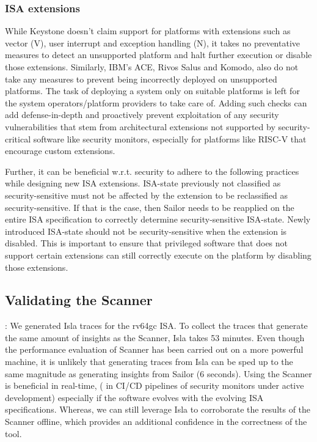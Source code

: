 \subsubsection{ISA extensions}
\label{sec:isa-ext-discussion}
While Keystone doesn't claim support for platforms with extensions such as vector (V), user interrupt and exception handling (N), it takes no preventative measures to detect an unsupported platform and halt further execution or disable those extensions. 
Similarly, IBM's ACE, Rivos Salus and Komodo, also do not take any measures to prevent being incorrectly deployed on unsupported platforms. 
The task of deploying a system only on suitable platforms is left for the system operators/platform providers to take care of. 
Adding such checks can add defense-in-depth and proactively prevent exploitation of any security vulnerabilities that stem from architectural extensions not supported by security-critical software like security monitors, especially for platforms like RISC-V that encourage custom extensions. 

Further, it can be beneficial w.r.t. security to adhere to the following practices while designing new ISA extensions.
ISA-state previously not classified as security-sensitive must not be affected by the extension to be reclassified as security-sensitive. If that is the case, then Sailor needs to be reapplied on the entire ISA specification to correctly determine security-sensitive ISA-state. 
Newly introduced ISA-state should not be security-sensitive when the extension is disabled. 
This is important to ensure that privileged software that does not support certain extensions can still correctly execute on the platform by disabling those extensions. 




\subsection{Validating the Scanner} 
\label{isla-vs-sailor}


: We generated Isla traces for the rv64gc ISA. To collect the traces that generate the same amount of insights as the Scanner, Isla takes 53 minutes. Even though the performance evaluation of Scanner has been carried out on a more powerful machine, it is unlikely that generating traces from Isla can be sped up to the same magnitude as generating insights from Sailor (6 seconds). 
Using the Scanner is beneficial in real-time, (\eg{} in CI/CD pipelines of security monitors under active development) especially if the software evolves with the evolving ISA specifications. 
Whereas, we can still leverage Isla to corroborate the results of the Scanner offline, which provides an additional confidence in the correctness of the tool. 

